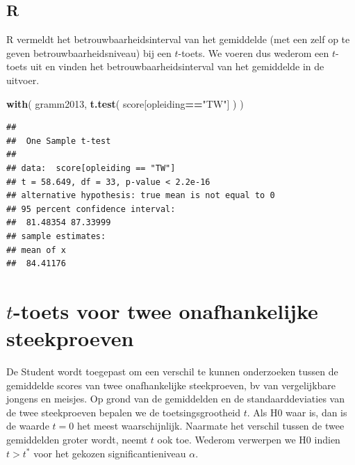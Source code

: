 \documentclass[
]{book}
\newenvironment{Shaded}{\begin{snugshade}}{\end{snugshade}}
\newcommand{\KeywordTok}[1]{\textcolor[rgb]{0.13,0.29,0.53}{\textbf{#1}}}
\newcommand{\NormalTok}[1]{#1}
\newcommand{\OperatorTok}[1]{\textcolor[rgb]{0.81,0.36,0.00}{\textbf{#1}}}
\newcommand{\StringTok}[1]{\textcolor[rgb]{0.31,0.60,0.02}{#1}}
\begin{document}
\hypertarget{r-12}{%
\subsection{R}\label{r-12}}

R vermeldt het betrouwbaarheidsinterval van het gemiddelde (met een zelf
op te geven betrouwbaarheidsniveau) bij een \(t\)-toets. We voeren dus wederom een \(t\)-toets
uit en vinden het betrouwbaarheidsinterval van het gemiddelde in de
uitvoer.

\begin{Shaded}
\begin{Highlighting}[]
\KeywordTok{with}\NormalTok{( gramm2013, }\KeywordTok{t.test}\NormalTok{( score[opleiding}\OperatorTok{==}\StringTok{"TW"}\NormalTok{] ) )}
\end{Highlighting}
\end{Shaded}

\begin{verbatim}
## 
##  One Sample t-test
## 
## data:  score[opleiding == "TW"]
## t = 58.649, df = 33, p-value < 2.2e-16
## alternative hypothesis: true mean is not equal to 0
## 95 percent confidence interval:
##  81.48354 87.33999
## sample estimates:
## mean of x 
##  84.41176
\end{verbatim}

\hypertarget{sec:ttoets-onafh}{%
\section{\texorpdfstring{\(t\)-toets voor twee onafhankelijke steekproeven}{t-toets voor twee onafhankelijke steekproeven}}\label{sec:ttoets-onafh}}

De Student wordt toegepast om een verschil te kunnen onderzoeken tussen
de gemiddelde scores van twee onafhankelijke steekproeven, bv van
vergelijkbare jongens en meisjes. Op grond van de gemiddelden en de
standaarddeviaties van de twee steekproeven bepalen we de
toetsingsgrootheid \(t\). Als H0 waar is, dan is de waarde \(t=0\) het meest
waarschijnlijk. Naarmate het verschil tussen de twee gemiddelden groter
wordt, neemt \(t\) ook toe. Wederom verwerpen we H0 indien \(t>t^*\) voor
het gekozen significantieniveau \(\alpha\).
\end{document}
